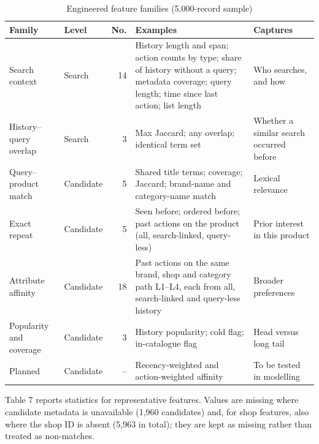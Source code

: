 \documentclass[11pt,a4paper]{article}
\newcommand{\hd}[1]{\textbf{#1}}
\newcommand{\tablestyle}{\small}
\newcommand{\headrow}{}
\begin{document}
\begin{table}[H]
\caption{Engineered feature families (5,000-record sample)}
\tablestyle
\centering
\begin{tabularx}{\textwidth}{>{\raggedright\arraybackslash}p{2.5cm} l r L L}
\toprule
\headrow \hd{Family} & \hd{Level} & \hd{No.} & \hd{Examples} & \hd{Captures} \\
\midrule
Search context & Search & 14 & History length and span; action counts by type; share of history without a query; metadata coverage; query length; time since last action; list length & Who searches, and how \\
History--query overlap & Search & 3 & Max Jaccard; any overlap; identical term set & Whether a similar search occurred before \\
Query--product match & Candidate & 5 & Shared title terms; coverage; Jaccard; brand-name and category-name match & Lexical relevance \\
Exact repeat & Candidate & 5 & Seen before; ordered before; past actions on the product (all, search-linked, query-less) & Prior interest in this product \\
Attribute affinity & Candidate & 18 & Past actions on the same brand, shop and category path L1--L4, each from all, search-linked and query-less history & Broader preferences \\
Popularity and coverage & Candidate & 3 & History popularity; cold flag; in-catalogue flag & Head versus long tail \\
Planned & Candidate & -- & Recency-weighted and action-weighted affinity & To be tested in modelling \\
\bottomrule
\end{tabularx}
\end{table}

Table 7 reports statistics for representative features. Values are missing where candidate metadata is unavailable (1,960 candidates) and, for shop features, also where the shop ID is absent (5,963 in total); they are kept as missing rather than treated as non-matches.
\end{document}
